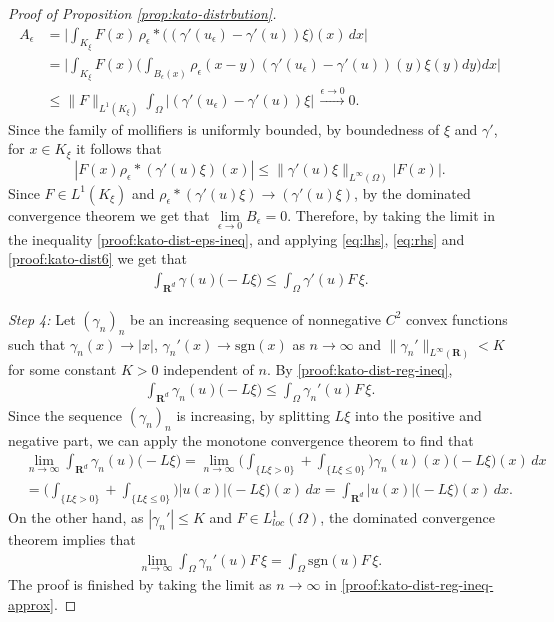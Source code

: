 \documentclass[a4paper,12pt,draft]{article}
\theoremstyle{plain}
\theoremstyle{definition}
\numberwithin{equation}{section}
\newcommand{\rd}{\mathbf{R}^d}
\newcommand\R{\mathbf{R}}
\renewcommand{\leq}{\leqslant}
\newcommand{\1}{1}
\begin{document}
\begin{proof}[Proof of Proposition \ref{prop:kato-distrbution}]
\begin{align*}
    A_\epsilon & = \Big| \int_{K_{\xi}} F(x)\,   \rho_\epsilon * \big((\gamma'(u_\epsilon)-\gamma'(u))\xi\big)(x) \, dx \Big|\\
    & = \Big|    \int_{K_{\xi}}  F(x)  \Big( \int_{B_\epsilon(x)} \rho_\epsilon(x-y) (\gamma'(u_\epsilon) - \gamma'(u))(y) \xi(y) dy \Big) dx \Big| \\
    & \leq \|F\|_{L^1(K_{\xi})} \int_{\Omega} \big| (\gamma'(u_\epsilon) - \gamma'(u))  \xi \big| \,  \xrightarrow{\epsilon\rightarrow 0} 0. 
\end{align*}
Since the family of mollifiers is uniformly bounded, by boundedness of $\xi$ and $\gamma'$, for $x\in K_\xi$  it follows that
$$|F(x) \rho_\epsilon* (\gamma'(u)\xi)(x)|\leq \|\gamma'(u)\xi\|_{L^{\infty}(\Omega)}|F(x)| . $$  
Since $F\in L^1(K_\xi)$ and $\rho_\epsilon* (\gamma'(u)\xi) \rightarrow (\gamma'(u)\xi)$, by the dominated convergence theorem we get that $\lim\limits_{\epsilon \rightarrow 0} B_\epsilon = 0$. Therefore, by taking the limit in the inequality \eqref{proof:kato-dist-eps-ineq}, and applying \eqref{eq:lhs}, \eqref{eq:rhs} and \eqref{proof:kato-dist6} we get that  
\begin{align}\label{proof:kato-dist-reg-ineq}
    \int_{\rd}  \gamma(u) \big(-L\xi\big) \leq  \int_{\Omega} \gamma'(u)F \, \xi. 
\end{align}

\textit{Step 4:} Let $(\gamma_{n})_{n}$ be an increasing sequence of nonnegative $C^2$ convex functions such that $ \gamma_n(x) \rightarrow |x|$, $\gamma_n'(x) \rightarrow \text{sgn}(x)$ as $n \rightarrow \infty$ and $\|\gamma_n'\|_{L^{\infty}(\R)}<K$ for some constant $K>0$ independent of $n$. By \eqref{proof:kato-dist-reg-ineq},
\begin{align}\label{proof:kato-dist-reg-ineq-approx}
    \int_{\rd}  \gamma_n(u) \big(-L\xi\big) \leq  \int_{\Omega} \gamma_n'(u)F \, \xi. 
\end{align}
Since the sequence $(\gamma_n)_n$ is increasing, by splitting $L\xi$ into the positive and negative part, we can apply the monotone convergence theorem to find that 
\begin{align*}
    & \lim_{n\to\infty} \int_{\rd}  \gamma_n(u) \big(-L\xi\big) = \lim_{n\to\infty} \Big( \int_{\{L\xi>0\}} + \int_{\{L\xi\leq 0\}}\Big) \gamma_n(u)(x) \big(-L\xi\big)(x) \, dx \\
    & = \Big( \int_{\{L\xi>0\}} + \int_{\{L\xi\leq 0\}}\Big)  |u(x)| \big(-L\xi\big)(x) \, dx = \int_{\rd} |u(x)| \big(-L\xi\big)(x) \, dx . 
\end{align*}
On the other hand, as $|\gamma_n'|\leq K$ and $F\in L^1_{loc}(\Omega)$, the dominated convergence theorem implies that 
\begin{align*}
    \lim_{n\to\infty} \int_{\Omega} \gamma_n'(u)F \, \xi = \int_{\Omega} \text{sgn}(u)F \, \xi.
\end{align*}
The proof is finished by taking the limit as $n\to\infty$  in \eqref{proof:kato-dist-reg-ineq-approx}. 


\end{proof}
\end{document}
